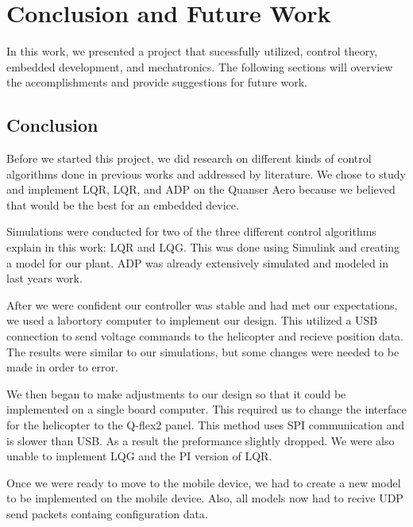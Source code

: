 \chapter{Conclusion and Future Work}
\label{ch: Chapter6}
In this work, we presented a project that sucessfully utilized, control theory, embedded development, and mechatronics.  The following sections will overview the accomplishments and provide suggestions for future work.

\section{Conclusion}
Before we started this project, we did research on different kinds of control algorithms done in previous works and addressed by literature.  We chose to study and implement LQR, LQR, and ADP on the Quanser Aero because we believed that would be the best for an embedded device.

Simulations were conducted for two of the three different control algorithms explain in this work: LQR and LQG.  This was done using Simulink and creating a model for our plant.  ADP was already extensively simulated and modeled in last years work.

After we were confident our controller was stable and had met our expectations, we used a labortory computer to implement our design.  This utilized a USB connection to send voltage commands to the helicopter and recieve position data.  The results were similar to our simulations, but some changes were needed to be made in order to error. 

We then began to make adjustments to our design so that it could be implemented on a single board computer.  This required us to change the interface for the helicopter to the Q-flex2 panel.  This method uses SPI communication and is slower than USB.  As a result the preformance slightly dropped.  We were also unable to implement LQG and the PI version of LQR.

Once we were ready to move to the mobile device, we had to create a new model to be implemented on the mobile device.  Also, all models now had to recive UDP send packets containg configuration data. 


